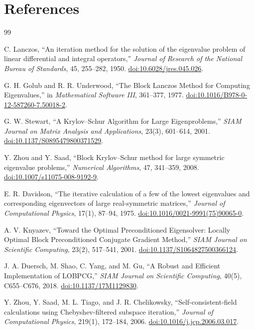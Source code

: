 \documentclass[11pt]{article}
\begin{document}
\section{References}

\begin{thebibliography}{99}

C. Lanczos,
``An iteration method for the solution of the eigenvalue problem of linear
differential and integral operators,''
\emph{Journal of Research of the National Bureau of Standards},
45, 255--282, 1950.
\href{https://doi.org/10.6028/jres.045.026}{doi:10.6028/jres.045.026}.

G. H. Golub and R. R. Underwood,
``The Block Lanczos Method for Computing Eigenvalues,'' in
\emph{Mathematical Software III}, 361--377, 1977.
\href{https://doi.org/10.1016/B978-0-12-587260-7.50018-2}%
{doi:10.1016/B978-0-12-587260-7.50018-2}.

G. W. Stewart,
``A Krylov--Schur Algorithm for Large Eigenproblems,''
\emph{SIAM Journal on Matrix Analysis and Applications},
23(3), 601--614, 2001.
\href{https://doi.org/10.1137/S0895479800371529}%
{doi:10.1137/S0895479800371529}.

Y. Zhou and Y. Saad,
``Block Krylov--Schur method for large symmetric eigenvalue problems,''
\emph{Numerical Algorithms}, 47, 341--359, 2008.
\href{https://doi.org/10.1007/s11075-008-9192-9}%
{doi:10.1007/s11075-008-9192-9}.

E. R. Davidson,
``The iterative calculation of a few of the lowest eigenvalues and
corresponding eigenvectors of large real-symmetric matrices,''
\emph{Journal of Computational Physics}, 17(1), 87--94, 1975.
\href{https://doi.org/10.1016/0021-9991(75)90065-0}%
{doi:10.1016/0021-9991(75)90065-0}.

A. V. Knyazev,
``Toward the Optimal Preconditioned Eigensolver: Locally Optimal Block
Preconditioned Conjugate Gradient Method,''
\emph{SIAM Journal on Scientific Computing}, 23(2), 517--541, 2001.
\href{https://doi.org/10.1137/S1064827500366124}%
{doi:10.1137/S1064827500366124}.

J. A. Duersch, M. Shao, C. Yang, and M. Gu,
``A Robust and Efficient Implementation of LOBPCG,''
\emph{SIAM Journal on Scientific Computing}, 40(5), C655--C676, 2018.
\href{https://doi.org/10.1137/17M1129830}{doi:10.1137/17M1129830}.

Y. Zhou, Y. Saad, M. L. Tiago, and J. R. Chelikowsky,
``Self-consistent-field calculations using Chebyshev-filtered subspace
iteration,''
\emph{Journal of Computational Physics}, 219(1), 172--184, 2006.
\href{https://doi.org/10.1016/j.jcp.2006.03.017}%
{doi:10.1016/j.jcp.2006.03.017}.


\end{thebibliography}
\end{document}
